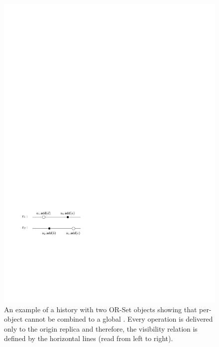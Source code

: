 \begin{figure}[t]
  \centering
  \includegraphics[width=0.35 \textwidth]{figures/TwoSubLin-NotaGlobalLin.pdf}
  \caption{An example of a history with two OR-Set objects showing that per-object  cannot be combined to a global \crdtlinearization{}. Every operation is delivered only to the origin replica and therefore, the visibility relation is defined by the horizontal lines (read from left to right).}
  \label{fig:negative_composition}
\end{figure}

